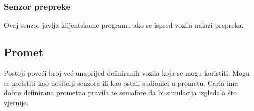 \subsubsection{Senzor prepreke}
Ovaj senzor javlja klijentskome programu ako se ispred vozila nalazi prepreka.

\subsection{Promet}
Postoji poveći broj već unaprijed definiranih vozila koja se mogu koristiti. Mogu se koristiti kao nositelji senzora ili kao ostali sudionici u prometu. Carla ima dobro definirana prometna pravila te semafore da bi simulacija izgledala što vjernije.
\newpage